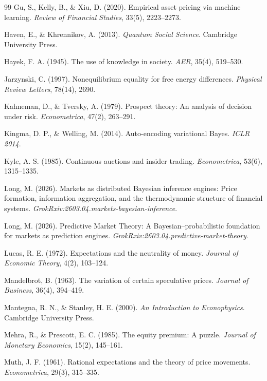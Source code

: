\documentclass[12pt,a4paper]{article}
\theoremstyle{definition}
\begin{document}
\begin{thebibliography}{99}
Gu, S., Kelly, B., \& Xiu, D. (2020). Empirical asset pricing via machine learning. \textit{Review of Financial Studies}, 33(5), 2223--2273.

Haven, E., \& Khrennikov, A. (2013). \textit{Quantum Social Science}. Cambridge University Press.

Hayek, F. A. (1945). The use of knowledge in society. \textit{AER}, 35(4), 519--530.

Jarzynski, C. (1997). Nonequilibrium equality for free energy differences. \textit{Physical Review Letters}, 78(14), 2690.

Kahneman, D., \& Tversky, A. (1979). Prospect theory: An analysis of decision under risk. \textit{Econometrica}, 47(2), 263--291.

Kingma, D. P., \& Welling, M. (2014). Auto-encoding variational Bayes. \textit{ICLR 2014}.

Kyle, A. S. (1985). Continuous auctions and insider trading. \textit{Econometrica}, 53(6), 1315--1335.

Long, M. (2026). Markets as distributed Bayesian inference engines: Price formation, information aggregation, and the thermodynamic structure of financial systems. \textit{GrokRxiv:2603.04.markets-bayesian-inference}.

Long, M. (2026). Predictive Market Theory: A Bayesian--probabilistic foundation for markets as prediction engines. \textit{GrokRxiv:2603.04.predictive-market-theory}.

Lucas, R. E. (1972). Expectations and the neutrality of money. \textit{Journal of Economic Theory}, 4(2), 103--124.

Mandelbrot, B. (1963). The variation of certain speculative prices. \textit{Journal of Business}, 36(4), 394--419.

Mantegna, R. N., \& Stanley, H. E. (2000). \textit{An Introduction to Econophysics}. Cambridge University Press.

Mehra, R., \& Prescott, E. C. (1985). The equity premium: A puzzle. \textit{Journal of Monetary Economics}, 15(2), 145--161.

Muth, J. F. (1961). Rational expectations and the theory of price movements. \textit{Econometrica}, 29(3), 315--335.


\end{thebibliography}
\end{document}
